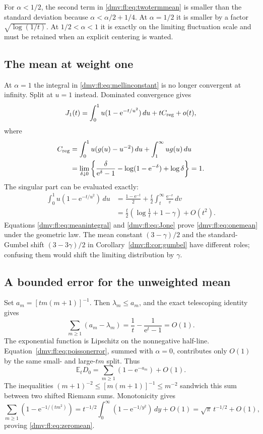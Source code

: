 \documentclass[11pt,letterpaper]{article}
\numberwithin{equation}{section}
\theoremstyle{definition}\newtheorem{definition}[theorem]{Definition}
\theoremstyle{remark}\newtheorem{remark}[theorem]{Remark}
\newcommand{\E}{\mathbb E}
\newcommand{\ee}{\mathrm e}
\begin{document}
For $\alpha<1/2$, the second term in \eqref{dmv:fl:eq:twotermmean} is smaller
than the standard deviation because
$\alpha<\alpha/2+1/4$. At $\alpha=1/2$ it is smaller by a factor
$\sqrt{\log(1/t)}$. At $1/2<\alpha<1$ it is exactly on the limiting
fluctuation scale and must be retained when an explicit centering is
wanted.

\subsection{The mean at weight one}
At $\alpha=1$ the integral in \eqref{dmv:fl:eq:mellinconstant} is no longer
convergent at infinity. Split at $u=1$ instead. Dominated convergence
gives
\begin{equation}\label{dmv:fl:eq:Jone}
 J_1(t)=\int_0^1u(1-\ee^{-t/u^2})\,du+tC_{\rm reg}+o(t),
\end{equation}
where
\begin{align*}
 C_{\rm reg}
 &=\int_0^1u(g(u)-u^{-2})\,du+\int_1^\infty ug(u)\,du\\
 &=\lim_{\delta\downarrow0}
 \left\{\frac{\delta}{\ee^\delta-1}
       -\log(1-\ee^{-\delta})+\log\delta\right\}=1.
\end{align*}
The singular part can be evaluated exactly:
\begin{align*}
 \int_0^1u(1-\ee^{-t/u^2})\,du
 &=\frac{1-\ee^{-t}}2+\frac t2\int_t^\infty\frac{\ee^{-v}}v\,dv\\
 &=\frac t2\left(\log\frac1t+1-\gamma\right)+O(t^2).
\end{align*}
Equations \eqref{dmv:fl:eq:meanintegral} and \eqref{dmv:fl:eq:Jone} prove
\eqref{dmv:fl:eq:onemean} under the geometric law. The mean constant
$(3-\gamma)/2$ and the standard-Gumbel shift $(3-3\gamma)/2$ in
Corollary~\ref{dmv:fl:cor:gumbel} have different roles; confusing them would
shift the limiting distribution by $\gamma$.

\subsection{A bounded error for the unweighted mean}
Set $a_m=[tm(m+1)]^{-1}$. Then $\lambda_m\le a_m$, and the exact
telescoping identity gives
\[
 \sum_{m\ge1}(a_m-\lambda_m)
 =\frac1t-\frac1{\ee^t-1}=O(1).
\]
The exponential function is Lipschitz on the nonnegative half-line.
Equation~\eqref{dmv:fl:eq:poissonerror}, summed with $\alpha=0$, contributes
only $O(1)$ by the same small- and large-$tm$ split. Thus
\[
 \E_tD_0=\sum_{m\ge1}(1-\ee^{-a_m})+O(1).
\]
The inequalities $(m+1)^{-2}\le[m(m+1)]^{-1}\le m^{-2}$ sandwich this
sum between two shifted Riemann sums. Monotonicity gives
\[
 \sum_{m\ge1}(1-\ee^{-1/(tm^2)})
 =t^{-1/2}\int_0^\infty(1-\ee^{-1/y^2})\,dy+O(1)
 =\sqrt\pi\,t^{-1/2}+O(1),
\]
proving \eqref{dmv:fl:eq:zeromean}.
\end{document}
